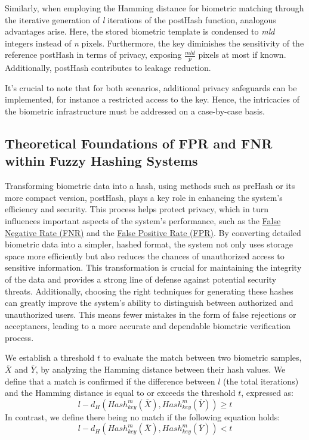Similarly, when employing the Hamming distance for biometric matching through the iterative generation of \textit{l} iterations of the postHash function, analogous advantages arise. Here, the stored biometric template is condensed to \textit{mld} integers instead of \textit{n} pixels. Furthermore, the key diminishes the sensitivity of the reference postHash in terms of privacy, exposing \(\frac{mld}{p}\) pixels at most if known. Additionally, postHash contributes to leakage reduction.

It's crucial to note that for both scenarios, additional privacy safeguards can be implemented, for instance a restricted access to the key. Hence, the intricacies of the biometric infrastructure must be addressed on a case-by-case basis.

\subsection{Theoretical Foundations of FPR and FNR within Fuzzy Hashing Systems}

Transforming biometric data into a hash, using methods such as preHash or its more compact version, postHash, plays a key role in enhancing the system's efficiency and security. This process helps protect privacy, which in turn influences important aspects of the system's performance, such as the \hyperref[def:FNR]{False Negative Rate (FNR)} and the \hyperref[def:FPR]{False Positive Rate (FPR)}. By converting detailed biometric data into a simpler, hashed format, the system not only uses storage space more efficiently but also reduces the chances of unauthorized access to sensitive information. This transformation is crucial for maintaining the integrity of the data and provides a strong line of defense against potential security threats. Additionally, choosing the right techniques for generating these hashes can greatly improve the system's ability to distinguish between authorized and unauthorized users. This means fewer mistakes in the form of false rejections or acceptances, leading to a more accurate and dependable biometric verification process.

We establish a threshold \(t\) to evaluate the match between two biometric samples, \(\bar{X}\) and \(\bar{Y}\), by analyzing the Hamming distance between their hash values.
We define that a match is confirmed if the difference between \(l\) (the total iterations) and the Hamming distance is equal to or exceeds the threshold \(t\), expressed as: \[l - d_H(Hash_{key}^m(\bar{X}), Hash_{key}^m(\bar{Y})) \geq t\]
In contrast, we define there being no match if the following equation holds: \[l - d_H(Hash_{key}^m(\bar{X}), Hash_{key}^m(\bar{Y})) < t\]

